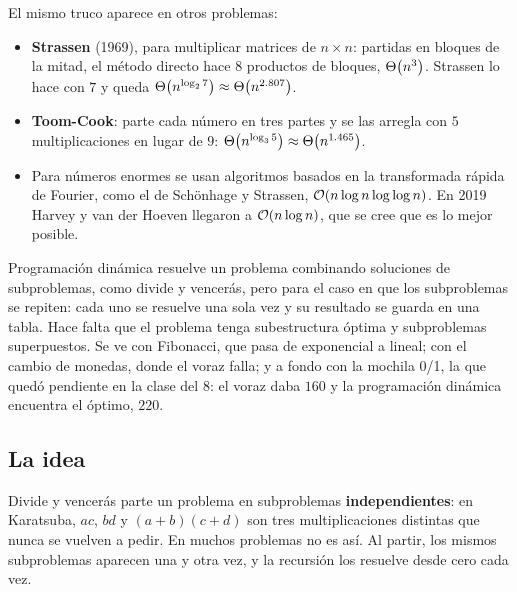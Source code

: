 \documentclass[11pt,letterpaper]{article}
\begin{document}
El mismo truco aparece en otros problemas:

\begin{itemize}[itemsep=0.3em]
  \item \textbf{Strassen} (1969), para multiplicar matrices de
        $n \times n$: partidas en bloques de la mitad, el método directo
        hace $8$ productos de bloques, $\Theta\!\left(n^{3}\right)$. Strassen lo hace
        con $7$ y queda $\Theta\!\left(n^{\log_2 7}\right) \approx \Theta\!\left(n^{2.807}\right)$.
  \item \textbf{Toom-Cook}: parte cada número en tres partes y se las
        arregla con $5$ multiplicaciones en lugar de $9$:
        $\Theta\!\left(n^{\log_3 5}\right) \approx \Theta\!\left(n^{1.465}\right)$.
  \item Para números enormes se usan algoritmos basados en la
        transformada rápida de Fourier, como el de Schönhage y
        Strassen, $\mathcal{O}\!\left(n \log n \log \log n\right)$. En 2019 Harvey y van
        der Hoeven llegaron a $\mathcal{O}\!\left(n \log n\right)$, que se cree que es lo
        mejor posible.
\end{itemize}

\newpage



\begin{quick_sum}
  Programación dinámica resuelve un problema combinando soluciones de
  subproblemas, como divide y vencerás, pero para el caso en que los
  subproblemas se repiten: cada uno se resuelve una sola vez y su
  resultado se guarda en una tabla. Hace falta que el problema tenga
  subestructura óptima y subproblemas superpuestos. Se ve con
  Fibonacci, que pasa de exponencial a lineal; con el cambio de
  monedas, donde el voraz falla; y a fondo con la mochila 0/1, la que
  quedó pendiente en la clase del $8$: el voraz daba $160$ y la
  programación dinámica encuentra el óptimo, $220$.
\end{quick_sum}

\subsection*{La idea}

Divide y vencerás parte un problema en subproblemas
\textbf{independientes}: en Karatsuba, $ac$, $bd$ y $(a+b)(c+d)$ son
tres multiplicaciones distintas que nunca se vuelven a pedir. En muchos
problemas no es así. Al partir, los mismos subproblemas aparecen una y
otra vez, y la recursión los resuelve desde cero cada vez.
\end{document}
